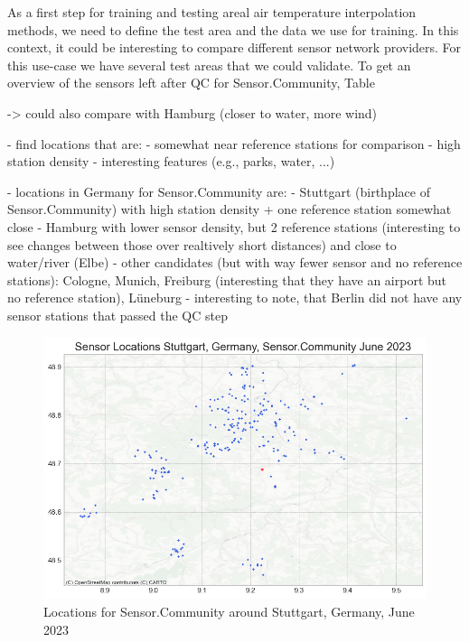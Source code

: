 As a first step for training and testing areal air temperature interpolation methods, we need to define the test area and the data we use for training. In this context, it could be interesting to compare different sensor network providers.
For this use-case we have several test areas that we could validate. To get an overview of the sensors left after QC for Sensor.Community, Table 

-> could also compare with Hamburg (closer to water, more wind)

- find locations that are:
  - somewhat near reference stations for comparison
  - high station density
  - interesting features (e.g., parks, water, ...)

- locations in Germany for Sensor.Community are:
  - Stuttgart (birthplace of Sensor.Community) with high station density + one reference station somewhat close
  - Hamburg with lower sensor density, but 2 reference stations (interesting to see changes between those over realtively short distances) and close to water/river (Elbe)
  - other candidates (but with way fewer sensor and no reference stations): Cologne, Munich, Freiburg (interesting that they have an airport but no reference station), Lüneburg
  - interesting to note, that Berlin did not have any sensor stations that passed the QC step\\

\begin{figure}[ht]
    \centering
    \includegraphics[width=1\textwidth]{images/sensor_community_locations_stuttgart_after_qc_june_23.png}
    \caption{Locations for Sensor.Community around Stuttgart, Germany, June 2023}
    \label{fig:qc sensor community stuttgart june 23}
\end{figure}

